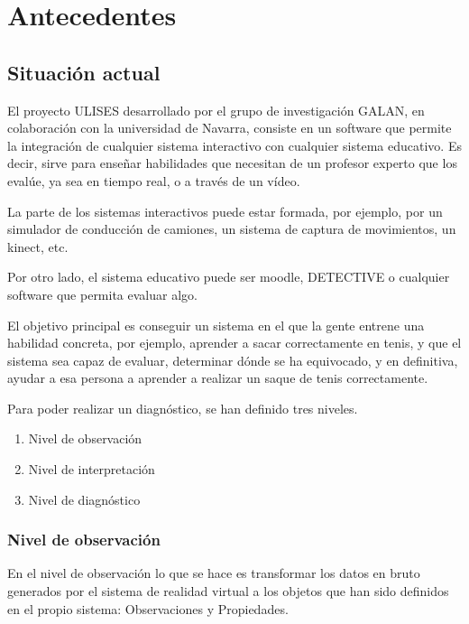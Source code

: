 \chapter{Antecedentes}

\section{Situaci\'on actual}
El proyecto ULISES desarrollado por el grupo de investigaci\'on GALAN, en colaboraci\'on con la universidad de Navarra, 
consiste en un software que permite la integraci\'on de cualquier sistema interactivo con cualquier
sistema educativo. Es decir, sirve para ense\~nar habilidades que necesitan de un profesor experto que los eval\'ue,
ya sea en tiempo real, o a trav\'es de un v\'ideo.


La parte de los sistemas interactivos puede estar formada, por ejemplo, por un simulador de conducci\'on de camiones,
un sistema de captura de movimientos, un kinect, etc.

Por otro lado, el sistema educativo puede ser moodle, DETECTIVE o cualquier software que permita evaluar algo.

El objetivo principal es conseguir un sistema en el que la gente entrene una habilidad concreta, por ejemplo, aprender
a sacar correctamente en tenis, y que el sistema sea capaz de evaluar, determinar d\'onde se ha equivocado, y en definitiva,
ayudar a esa persona a aprender a realizar un saque de tenis correctamente.

Para poder realizar un diagn\'ostico, se han definido tres niveles.

\begin{enumerate}
	\item Nivel de observaci\'on
	\item Nivel de interpretaci\'on
	\item Nivel de diagn\'ostico
\end{enumerate}

\subsection{Nivel de observaci\'on}
En el nivel de observaci\'on lo que se hace es transformar los datos en bruto generados por el sistema de realidad virtual
a los objetos que han sido definidos en el propio sistema: Observaciones y Propiedades.

